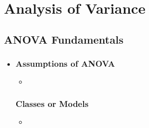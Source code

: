 \chapter{Analysis of Variance}

\section{ANOVA Fundamentals}
\begin{itemize}
  \item[]

  \subsection{Assumptions of ANOVA}
  \begin{itemize}
    \item 
  \end{itemize}
  
  \subsection{Classes or Models}
  \begin{itemize}
    \item 
  \end{itemize}
  
\end{itemize}

